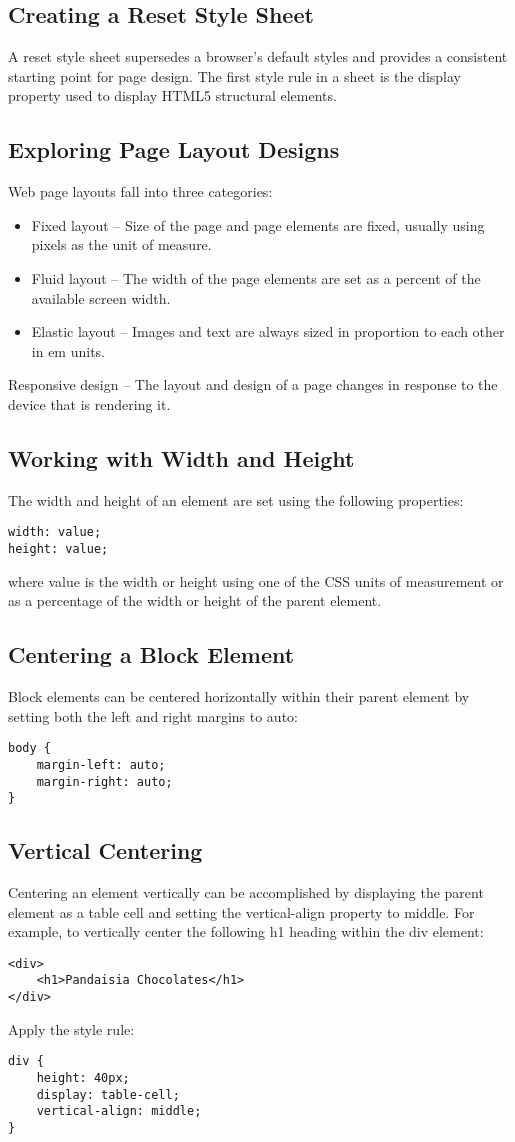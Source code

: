 \documentclass{article}
\begin{document}
\subsection{Creating a Reset Style Sheet}
A reset style sheet supersedes a browser’s default styles and provides a consistent starting point for page design. The first style rule in a sheet is the display property used to display HTML5 structural elements.

\subsection{Exploring Page Layout Designs}
Web page layouts fall into three categories:
\begin{itemize}
    \item Fixed layout – Size of the page and page elements are fixed, usually using pixels as the unit of measure.
    \item Fluid layout – The width of the page elements are set as a percent of the available screen width.
    \item Elastic layout – Images and text are always sized in proportion to each other in em units.
\end{itemize}
Responsive design – The layout and design of a page changes in response to the device that is rendering it.

\subsection{Working with Width and Height}
The width and height of an element are set using the following properties:
\begin{lstlisting}
width: value;
height: value;
\end{lstlisting}
where value is the width or height using one of the CSS units of measurement or as a percentage of the width or height of the parent element.

\subsection{Centering a Block Element}
Block elements can be centered horizontally within their parent element by setting both the left and right margins to auto:
\begin{lstlisting}
body {
    margin-left: auto;
    margin-right: auto;
}
\end{lstlisting}

\subsection{Vertical Centering}
Centering an element vertically can be accomplished by displaying the parent element as a table cell and setting the vertical-align property to middle. For example, to vertically center the following h1 heading within the div element:
\begin{lstlisting}
<div>
    <h1>Pandaisia Chocolates</h1>
</div>
\end{lstlisting}
Apply the style rule:
\begin{lstlisting}
div {
    height: 40px;
    display: table-cell;
    vertical-align: middle;
}
\end{lstlisting}
\end{document}
